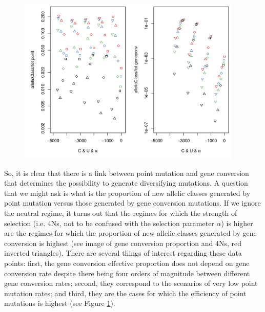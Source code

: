 \documentclass[a4paper,10pt]{article}
\begin{document}
\begin{figure}[htb]
\begin{center}
\leavevmode
\includegraphics[width=0.95\textwidth] {./Images/Rplot_allelicClassEffVsTot_pointGeneconv.pdf}
\end{center}
\caption{\small{}}
\label{FigEffMuts}
\end{figure}

So, it is clear that there is a link between point mutation and gene conversion that determines the possibility to generate diversifying mutations. A question that we might ask is what is the proportion of new allelic classes generated by point mutation versus those generated by gene conversion mutations. If we ignore the neutral regime, it turns out that the regimes for which the strength of selection (i.e. 4Ns, not to be confused with the selection parameter $\alpha$) is higher are the regimes for which the proportion of new allelic classes generated by gene conversion is highest (see image of gene conversion proportion and 4Ns, red inverted triangles). There are several things of interest regarding these data points: first, the gene conversion effective proportion does not depend on gene conversion rate despite there being four orders of magnitude between different gene conversion rates; second, they correspond to the scenarios of very low point mutation rates; and third, they are the cases for which the efficiency of point mutations is highest (see Figure \ref{FigEffMuts}). 
\end{document}
